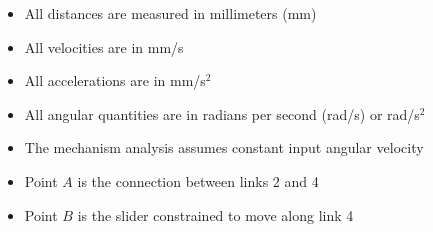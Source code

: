 \documentclass[12pt]{article}
\begin{document}
\begin{itemize}
  \item All distances are measured in millimeters (mm)
  \item All velocities are in mm/s
  \item All accelerations are in mm/s$^2$
  \item All angular quantities are in radians per second (rad/s) or rad/s$^2$
  \item The mechanism analysis assumes constant input angular velocity
  \item Point $A$ is the connection between links 2 and 4
  \item Point $B$ is the slider constrained to move along link 4
\end{itemize}
\end{document}
